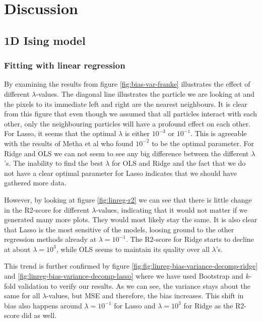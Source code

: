 \section{Discussion}

\subsection{1D Ising model}
\subsubsection{Fitting with linear regression}
By examining the results from figure \ref{fig:bias-var-franke} illustrates the effect of different $\lambda$-values. The diagonal line illustrates the particle we are looking at and the pixels to its immediate left and right are the nearest neighbours. It is clear from this figure that even though we assumed that all particles interact with each other, only the neighbouring particles will have a profound effect on each other. For Lasso, it seems that the optimal $\lambda$ is either $10^{-3}$ or $10^{-1}$. This is agreeable with the results of Metha et al \cite{2018arXiv180308823M} who found $10^{-2}$ to be the optimal parameter. For Ridge and OLS we can not seem to see any big difference between the different $\lambda$'s. The inability to find the best $\lambda$ for OLS and Ridge and the fact that we do not have a clear optimal parameter for Lasso indicates that we should have gathered more data. 

However, by looking at figure \ref{fig:linreg-r2} we can see that there is little change in the R2-score for different $\lambda$-values, indicating that it would not matter if we generated many more plots. They would most likely stay the same. It is also clear that Lasso is the most sensitive of the models, loosing ground to the other regression methods already at $\lambda = 10^{-1}$. The R2-score for Ridge starts to decline at about $\lambda = 10^{3}$, while OLS seems to maintain its quality over all $\lambda$'s. 

This trend is further confirmed by figure \ref{fig:fig:linreg-bias-variance-decomp-ridge} and \ref{fig:linreg-bias-variance-decomp-lasso} where we have used Bootstrap and $k$-fold validation to verify our results. As we can see, the variance stays about the same for all $\lambda$-values, but MSE and therefore, the bias increases. This shift in bias also happens around $\lambda = 10^{-1}$ for Lasso and $\lambda = 10^{3}$ for Ridge as the R2-score did as well.

